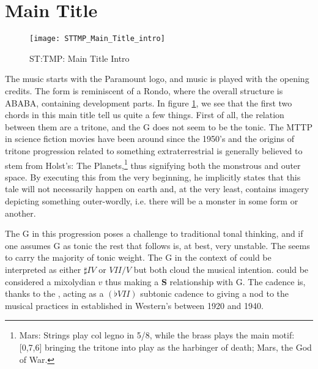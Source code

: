 \section{Main Title}\label{sec:STTMP Main Title}
\begin{figure}[h!]
\center
\texttt{[image: STTMP\_Main\_Title\_intro]}
	\caption{ST:TMP: Main Title Intro}
	\label{fg:sttmp_main_title_intro}
\end{figure}
\noindent The music starts with the Paramount logo, and music is played with the opening credits. The form is reminiscent of a Rondo, where the overall structure is ABABA, containing development parts.
In figure \ref{fg:sttmp_main_title_intro}, we see that the first two chords in this main title tell us quite a few things. First of all, the relation between them are a tritone, and the G does not seem to be the tonic. The \acf{MTTP} in science fiction movies have been around since the 1950's and the origins of tritone progression related to something extraterrestrial is generally believed to stem from Holst's: The Planets,\footnote{Mars: Strings play col legno in 5/8, while the brass plays the main motif: [0,7,6]  bringing the tritone into play as the harbinger of death; Mars, the God of War.} thus signifying both the monstrous and outer space. By executing this from the very beginning, he implicitly states that this tale will not necessarily happen on earth and, at the very least, contains imagery depicting something outer-wordly, i.e. there will be a monster in some form or another. 

The G in this progression poses a challenge to traditional tonal thinking, and if one assumes G as tonic the rest that follows is, at best, very unstable. The \ciss seems to carry the majority of tonic weight. The G in the context of \ciss could be interpreted as either \(\sharp{IV}\) or \(VII/V\) but both cloud the musical intention. \gissm could be considered a mixolydian \(v\) thus making a \textbf{S} relationship with G. The cadence is, thanks to the \giss, acting as a \(({\flat}VII)\) subtonic cadence to \bflat giving a nod to the musical practices in established in Western's between 1920 and 1940.

